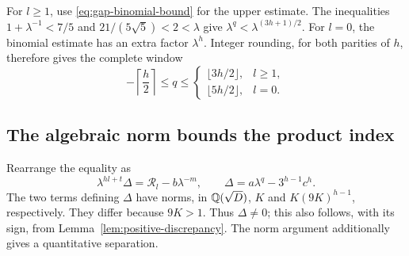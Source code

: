 For $l\geqslant1$, use \eqref{eq:gap-binomial-bound} for the upper
estimate. The inequalities
$1+\lambda^{-1}<7/5$ and $21/(5\sqrt5)<2<\lambda$ give
$\lambda^q<\lambda^{(3h+1)/2}$. For $l=0$, the binomial estimate
has an extra factor $\lambda^h$. Integer rounding, for both parities
of $h$, therefore gives the complete window
\begin{equation}\label{eq:gap-phase-window}
 -\left\lceil\frac h2\right\rceil\leqslant q\leqslant
 \begin{cases}
 \lfloor3h/2\rfloor,&l\geqslant1,\\
 \lfloor5h/2\rfloor,&l=0.
 \end{cases}
\end{equation}

\subsection{The algebraic norm bounds the product index}

Rearrange the equality as
\begin{equation}\label{eq:gap-leading-discrepancy}
 \lambda^{hl+t}\Delta=\mathcal R_l-b\lambda^{-m},
 \qquad \Delta=a\lambda^q-3^{h-1}c^h.
\end{equation}
The two terms defining $\Delta$ have norms, in $\mathbb{Q}(\sqrt D)$,
$K$ and $K(9K)^{h-1}$, respectively. They differ because $9K>1$.
Thus $\Delta\ne0$; this also follows, with its sign, from
Lemma~\ref{lem:positive-discrepancy}. The norm argument additionally
gives a quantitative separation.

